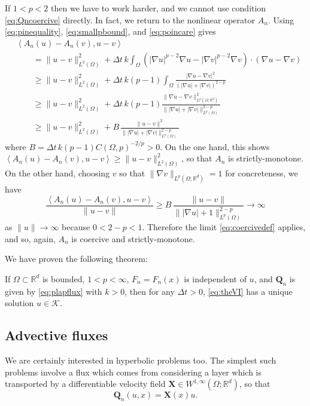 \documentclass[final,leqno,onefignum,onetabnum]{siamltex1213bueler}
\newcommand\bQ{\mathbf{Q}}
\newcommand\bX{\mathbf{X}}
\renewcommand{\grad}{\nabla}
\newcommand{\ip}[2]{\ensuremath{\left<#1,#2\right>}}
\newcommand\RR{\mathbb{R}}
\begin{document}
If $1<p<2$ then we have to work harder, and we cannot use condition \eqref{eq:Qncoercive} directly.  In fact, we return to the nonlinear operator $A_n$.  Using \eqref{eq:pinequality}, \eqref{eq:smallpbound}, and \eqref{eq:poincare} gives
\begin{align*}
  &\ip{A_n(u) - A_n(v)}{u-v} \\
  &\qquad = \|u-v\|_{L^2(\Omega)}^2 + \Delta t\,k \int_\Omega \left(|\grad u|^{p-2} \grad u - |\grad v|^{p-2} \grad v\right)\cdot (\grad u - \grad v) \\
  &\qquad \ge \|u-v\|_{L^2(\Omega)}^2 + \Delta t\,k (p-1) \int_\Omega \frac{|\grad u - \grad v|^2}{\left(|\grad u|+|\grad v|\right)^{2-p}} \\
  &\qquad \ge \|u-v\|_{L^2(\Omega)}^2 + \Delta t\,k (p-1) \frac{\|\grad u - \grad v\|_{L^p(\Omega; \RR^d)}^2}{\big\||\grad u|+|\grad v|\big\|_{L^p(\Omega)}^{2-p}} \\
  &\qquad \ge \|u-v\|_{L^2(\Omega)}^2 + B\, \frac{\|u - v\|^2}{\big\||\grad u|+|\grad v|\big\|_{L^p(\Omega)}^{2-p}}
\end{align*}
where $B = \Delta t\,k (p-1) C(\Omega,p)^{-2/p} >0$.  On the one hand, this shows $\ip{A_n(u) - A_n(v)}{u-v} \ge \|u-v\|_{L^2(\Omega)}^2$, so that $A_n$ is strictly-monotone.  On the other hand, choosing $v$ so that $\|\grad v\|_{L^p(\Omega;\RR^d)} = 1$ for concreteness, we have
\begin{equation*}
\frac{\ip{A_n(u) - A_n(v)}{u-v}}{\|u-v\|} \ge B\, \frac{\|u - v\|}{\big\||\grad u|+1\big\|_{L^p(\Omega)}^{2-p}} \to \infty
\end{equation*}
as $\|u\|\to\infty$ because $0<2-p<1$.  Therefore the limit \eqref{eq:coercivedef} applies, and so, again, $A_n$  is coercive and strictly-monotone.

We have proven the following theorem:

\begin{theorem}  \label{thm:plapwellposed}  If $\Omega\subset \RR^d$ is bounded, $1<p<\infty$, $F_n=F_n(x)$ is independent of $u$, and $\bQ_n$ is given by \eqref{eq:plapflux} with $k>0$, then for any $\Delta t>0$, \eqref{eq:theVI} has a unique solution $u\in\mathcal{K}$.
\end{theorem}

\subsection{Advective fluxes} \label{subsec:advect}  We are certainly interested in hyperbolic problems too.  The simplest such problems involve a flux which comes from considering a layer which is transported by a differentiable velocity field $\bX \in W^{1,\infty}(\Omega;\RR^d)$, so that
\begin{equation}
  \bQ_n(u,x) = \bX(x) u. \label{eq:advectflux}
\end{equation}
\end{document}
